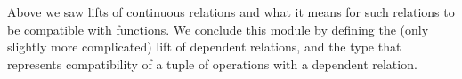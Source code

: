 Above we saw lifts of continuous relations and what it means for such relations to be compatible with functions. We conclude this module by defining the (only slightly more complicated) lift of dependent relations, and the type that represents compatibility of a tuple of operations with a dependent relation.
\ccpad
\begin{code}%
\>[0]\AgdaSpace{}%
\AgdaModule{\AgdaUnderscore{}}\AgdaSpace{}%
\AgdaSymbol{\{}\AgdaSpace{}%
\AgdaSpace{}%
\AgdaSymbol{:}\AgdaSpace{}%
\AgdaSpace{}%
\AgdaSymbol{\}}\AgdaSpace{}%
\AgdaSymbol{\{}\AgdaSpace{}%
\AgdaSymbol{:}\AgdaSpace{}%
\AgdaSpace{}%
\AgdaSpace{}%
\AgdaSpace{}%
\AgdaSymbol{\}}\AgdaSpace{}%
\<%
\\
%
\\[\AgdaEmptyExtraSkip]%
\>[0][@{}l@{\AgdaIndent{0}}]%
\>[1]\AgdaSpace{}%
\AgdaSymbol{:}\AgdaSpace{}%
\AgdaSpace{}%
\AgdaSpace{}%
\AgdaSpace{}%
\AgdaSpace{}%
\AgdaSpace{}%
\AgdaSpace{}%
\AgdaSpace{}%
\AgdaSpace{}%
\AgdaSpace{}%
\AgdaSpace{}%
\AgdaSpace{}%
\AgdaSymbol{)}\AgdaSpace{}%
\AgdaSpace{}%
\AgdaSpace{}%
\AgdaSpace{}%
\AgdaSpace{}%
\<%
\\
%
\>[1]\AgdaSpace{}%
\AgdaSpace{}%
\AgdaSpace{}%
\AgdaSymbol{=}\AgdaSpace{}%
\AgdaSpace{}%
\AgdaSymbol{(}\AgdaSpace{}%
\AgdaSymbol{:}\AgdaSpace{}%
\AgdaSymbol{)}\AgdaSpace{}%
\AgdaSpace{}%
\AgdaSpace{}%
\AgdaSpace{}%
\AgdaSpace{}%
\AgdaSpace{}%
\AgdaSymbol{(}\AgdaSpace{}%
\AgdaSymbol{)}\AgdaSpace{}%
\AgdaSymbol{)}\<%
\\
%
\\[\AgdaEmptyExtraSkip]%
%
\>[1]\AgdaSpace{}%
\AgdaSymbol{:}\AgdaSpace{}%
\AgdaSpace{}%
\AgdaSpace{}%
\AgdaSpace{}%
\AgdaSymbol{(}\AgdaSpace{}%
\AgdaSpace{}%
\AgdaSpace{}%
\AgdaSymbol{)}\AgdaSpace{}%

\end{code}
